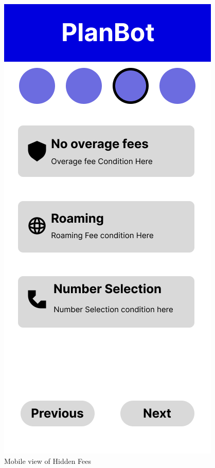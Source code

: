 \documentclass[conference]{IEEEtran}
\begin{document}
\begin{figure}[H]
    \centering
    \includegraphics[width=1\linewidth]{Mobile/Group 17MOBILE.png}
    \caption{Mobile view of Hidden Fees}
    \label{fig:user flow}
\end{figure}
\end{document}
